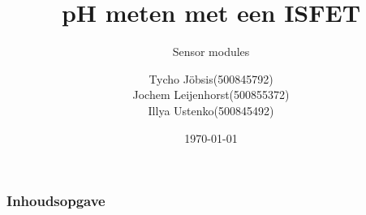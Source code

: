 \documentclass[compress]{beamer}
\institute{HvA}
\date{\today}
\begin{document}
\title{pH meten met een ISFET}
\subtitle{Sensor modules}
\author[Tycho Jöbsis \and Jochem Leijenhorst \and Illya Ustenko]{
    {
        \begin{tabular}{ll}
            Tycho Jöbsis        & (500845792)\tabularnewline
            Jochem Leijenhorst  & (500855372)\tabularnewline
            Illya Ustenko       & (500845492)        
        \end{tabular}
    }
}

    \begin{frame}
        \titlepage
    \end{frame}
    
    \begin{frame}
        \frametitle{Inhoudsopgave}\tableofcontents
    \end{frame} 
\end{document}

